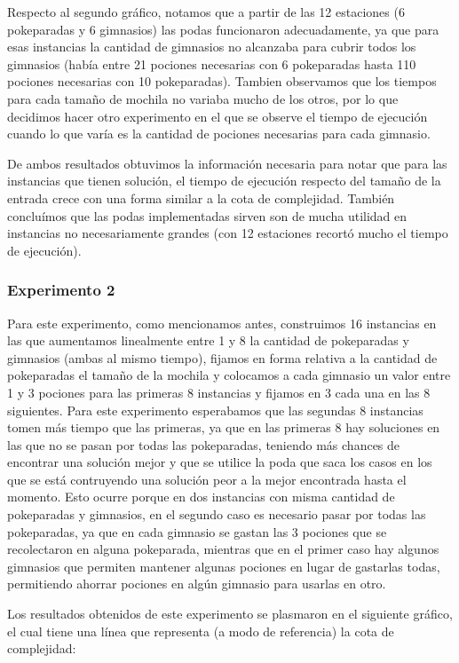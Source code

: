       Respecto al segundo gráfico, notamos que a partir de las 12 estaciones (6 pokeparadas y 6 gimnasios) las podas funcionaron adecuadamente, ya que para esas instancias la cantidad de gimnasios no alcanzaba para cubrir todos los gimnasios (había entre 21 pociones necesarias con 6 pokeparadas hasta 110 pociones necesarias con 10 pokeparadas). Tambien observamos que los tiempos para cada tamaño de mochila no variaba mucho de los otros, por lo que decidimos hacer otro experimento en el que se observe el tiempo de ejecución cuando lo que varía es la cantidad de pociones necesarias para cada gimnasio.

      De ambos resultados obtuvimos la información necesaria para notar que para las instancias que tienen solución, el tiempo de ejecución respecto del tamaño de la entrada crece con una forma similar a la cota de complejidad. También concluímos que las podas implementadas sirven son de mucha utilidad en instancias no necesariamente grandes (con 12 estaciones recortó mucho el tiempo de ejecución).

    \subsubsection{Experimento 2}


      Para este experimento, como mencionamos antes, construimos 16 instancias en las que aumentamos linealmente entre 1 y 8 la cantidad de pokeparadas y gimnasios (ambas al mismo tiempo), fijamos en forma relativa a la cantidad de pokeparadas el tamaño de la mochila y colocamos a cada gimnasio un valor entre 1 y 3 pociones para las primeras 8 instancias y fijamos en 3 cada una en las 8 siguientes.
      Para este experimento esperabamos que las segundas 8 instancias tomen más tiempo que las primeras, ya que en las primeras 8 hay soluciones en las que no se pasan por todas las pokeparadas, teniendo más chances de encontrar una solución mejor y que se utilice la poda que saca los casos en los que se está contruyendo una solución peor a la mejor encontrada hasta el momento. Esto ocurre porque en dos instancias con misma cantidad de pokeparadas y gimnasios, en el segundo caso es necesario pasar por todas las pokeparadas, ya que en cada gimnasio se gastan las 3 pociones que se recolectaron en alguna pokeparada, mientras que en el primer caso hay algunos gimnasios que permiten mantener algunas pociones en lugar de gastarlas todas, permitiendo ahorrar pociones en algún gimnasio para usarlas en otro.

      Los resultados obtenidos de este experimento se plasmaron en el siguiente gráfico, el cual tiene una línea que representa (a modo de referencia) la cota de complejidad:

